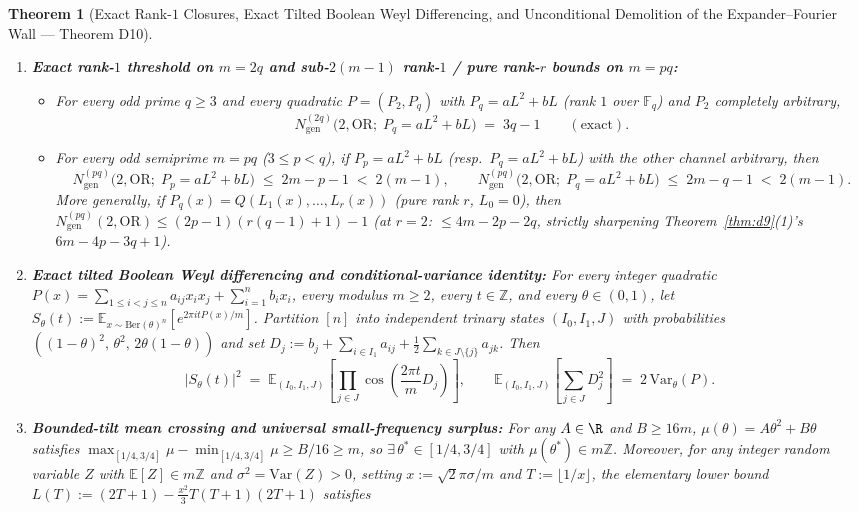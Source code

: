 \documentclass[11pt,a4paper]{article}
\newtheorem{theorem}{Theorem}[section]
\theoremstyle{definition}
\newcommand{\F}{\mathbb{F}}
\newcommand{\Z}{\mathbb{Z}}
\newcommand{\OR}{\mathrm{OR}}
\begin{document}
\begin{theorem}[Exact Rank-$1$ Closures, Exact Tilted Boolean Weyl Differencing, and Unconditional Demolition of the Expander--Fourier Wall --- Theorem D10]
\label{thm:d10}
\begin{enumerate}[leftmargin=*,nosep]
  \item \textbf{Exact rank-$1$ threshold on $m = 2q$ and sub-$2(m-1)$ rank-$1$ / pure rank-$r$ bounds on $m = pq$:}
  \begin{itemize}[leftmargin=*,nosep]
    \item For every odd prime $q \ge 3$ and every quadratic $P = (P_2, P_q)$ with $P_q = a L^2 + b L$ (rank $1$ over $\F_q$) and $P_2$ completely arbitrary,
    \[
      N_{\mathrm{gen}}^{(2q)}\bigl(2, \OR;\; P_q = a L^2 + b L\bigr) \;=\; 3q - 1 \qquad (\text{exact}).
    \]
    \item For every odd semiprime $m = pq$ ($3 \le p < q$), if $P_p = a L^2 + b L$ (resp.\ $P_q = a L^2 + b L$) with the other channel arbitrary, then
    \[
      N_{\mathrm{gen}}^{(pq)}\bigl(2, \OR;\; P_p = a L^2 + b L\bigr) \;\le\; 2m - p - 1 \;<\; 2(m - 1),
      \qquad
      N_{\mathrm{gen}}^{(pq)}\bigl(2, \OR;\; P_q = a L^2 + b L\bigr) \;\le\; 2m - q - 1 \;<\; 2(m - 1).
    \]
    More generally, if $P_q(x) = Q(L_1(x), \dots, L_r(x))$ (pure rank $r$, $L_0 = 0$), then $N_{\mathrm{gen}}^{(pq)}(2, \OR) \le (2p - 1)(r(q - 1) + 1) - 1$ (at $r = 2$: $\le 4m - 2p - 2q$, strictly sharpening Theorem~\ref{thm:d9}(1)'s $6m - 4p - 3q + 1$).
  \end{itemize}
  \item \textbf{Exact tilted Boolean Weyl differencing and conditional-variance identity:} For every integer quadratic $P(x) = \sum_{1 \le i < j \le n} a_{ij} x_i x_j + \sum_{i=1}^n b_i x_i$, every modulus $m \ge 2$, every $t \in \Z$, and every $\theta \in (0, 1)$, let $S_\theta(t) := \mathbb{E}_{x \sim \mathrm{Ber}(\theta)^n}[e^{2\pi i t P(x) / m}]$. Partition $[n]$ into independent trinary states $(I_0, I_1, J)$ with probabilities $((1 - \theta)^2,\, \theta^2,\, 2\theta(1 - \theta))$ and set $D_j := b_j + \sum_{i \in I_1} a_{ij} + \frac{1}{2}\sum_{k \in J \setminus \{j\}} a_{jk}$. Then
  \[
    \bigl|S_\theta(t)\bigr|^2 \;=\; \mathbb{E}_{(I_0, I_1, J)}\!\left[\prod_{j \in J} \cos\!\left(\frac{2\pi t}{m} D_j\right)\right],
    \qquad
    \mathbb{E}_{(I_0, I_1, J)}\!\left[\sum_{j \in J} D_j^2\right] \;=\; 2\,\mathrm{Var}_\theta(P).
  \]
  \item \textbf{Bounded-tilt mean crossing and universal small-frequency surplus:} For any $A \in \R$ and $B \ge 16m$, $\mu(\theta) = A\theta^2 + B\theta$ satisfies $\max_{[1/4,3/4]}\mu - \min_{[1/4,3/4]}\mu \ge B/16 \ge m$, so $\exists\,\theta^* \in [1/4, 3/4]$ with $\mu(\theta^*) \in m\Z$. Moreover, for any integer random variable $Z$ with $\mathbb{E}[Z] \in m\Z$ and $\sigma^2 = \mathrm{Var}(Z) > 0$, setting $x := \sqrt{2}\pi\sigma / m$ and $T := \lfloor 1/x \rfloor$, the elementary lower bound $L(T) := (2T + 1) - \frac{x^2}{3} T(T + 1)(2T + 1)$ satisfies

\end{enumerate}
\end{theorem}
\end{document}
